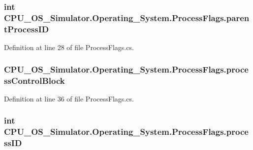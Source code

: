 \subsubsection[{parent\+Process\+I\+D}]{\setlength{\rightskip}{0pt plus 5cm}int C\+P\+U\+\_\+\+O\+S\+\_\+\+Simulator.\+Operating\+\_\+\+System.\+Process\+Flags.\+parent\+Process\+I\+D}\label{struct_c_p_u___o_s___simulator_1_1_operating___system_1_1_process_flags_a115209ffd287aaba9aa6b1bf9ba7a968}


Definition at line 28 of file Process\+Flags.\+cs.

\hypertarget{struct_c_p_u___o_s___simulator_1_1_operating___system_1_1_process_flags_adca49f9a3ee1f5e380a7547b0b8b73d6}{}
\subsubsection[{process\+Control\+Block}]{ C\+P\+U\+\_\+\+O\+S\+\_\+\+Simulator.\+Operating\+\_\+\+System.\+Process\+Flags.\+process\+Control\+Block}\label{struct_c_p_u___o_s___simulator_1_1_operating___system_1_1_process_flags_adca49f9a3ee1f5e380a7547b0b8b73d6}


Definition at line 36 of file Process\+Flags.\+cs.

\hypertarget{struct_c_p_u___o_s___simulator_1_1_operating___system_1_1_process_flags_a5a0ef784d6cef8d5d42ab43b69972f5b}{}
\subsubsection[{process\+I\+D}]{\setlength{\rightskip}{0pt plus 5cm}int C\+P\+U\+\_\+\+O\+S\+\_\+\+Simulator.\+Operating\+\_\+\+System.\+Process\+Flags.\+process\+I\+D}\label{struct_c_p_u___o_s___simulator_1_1_operating___system_1_1_process_flags_a5a0ef784d6cef8d5d42ab43b69972f5b}


